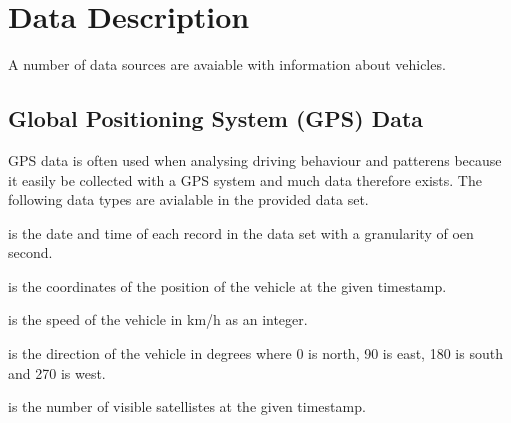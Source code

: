 \section{Data Description}
A number of data sources are avaiable with information about vehicles.

\subsection{Global Positioning System (GPS) Data}
GPS data is often used when analysing driving behaviour and patterens because it easily be collected with a GPS system and much data therefore exists. 
The following data types are avialable in the provided data set.
\vspace{-5mm}
\begin{description*}
\item{} is the date and time of each record in the data set with a granularity of oen second. 
\item{} is the coordinates of the position of the vehicle at the given timestamp.
\item{} is the speed of the vehicle in km/h as an integer.
\item{} is the direction of the vehicle in degrees where 0 is north, 90 is east, 180 is south and 270 is west.
\item{} is the number of visible satellistes at the given timestamp.
\end{description*}

